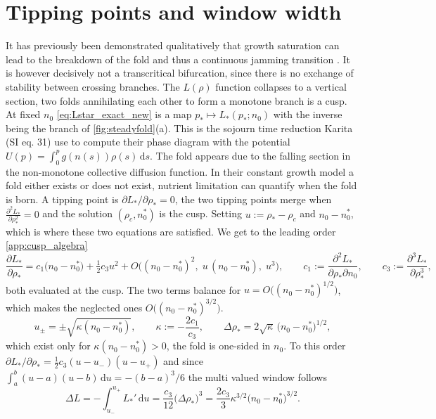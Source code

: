 \documentclass[11pt,a4paper]{report}
\newcommand{\dd}{\,\mathrm d}
\newcommand{\pd}{\partial}
\begin{document}
	\section{Tipping points and window width}
\label{sec:tipping}
It has previously been demonstrated qualitatively that growth saturation can lead to the breakdown of the fold and thus a continuous jamming transition \cite{peris}. It is however decisively not a transcritical bifurcation, since there is no exchange of stability between crossing branches. The $L(\rho)$ function collapses to a vertical section, two folds annihilating each other to form a monotone branch is a cusp.
At fixed $n_0$ \eqref{eq:Lstar_exact_new} is a map $p_*\mapsto L_*(p_*;n_0)$ with the inverse being the branch of \cref{fig:steadyfold}(a).  This is the sojourn time reduction Karita \cite{Karita} (SI eq. 31) use to compute their phase diagram with the potential $U(p)=\int_0^pg(n(s))\rho(s)\dd s$.
The fold appears due to the falling section in the non-monotone collective diffusion function. In their constant growth model a fold either exists or does not exist, nutrient limitation can quantify when the fold is born. A tipping point is $\pd L_*/\pd\rho_*=0$, the two tipping points merge when $\frac{\partial^2 L_*}{\partial \rho_*^2}=0$ and the solution
$(\rho_c,n_0^{*})$ is the cusp. Setting $u:=\rho_*-\rho_c$ and $n_0-n_0^{*}$, which is where these two equations are satisfied. We get to the leading order \cref{app:cusp_algebra}
\begin{equation}
	\frac{\pd L_*}{\pd\rho_*}
	=c_1\bigl(n_0-n_0^{*}\bigr)+\tfrac12c_3u^2
	+O\!\bigl((n_0-n_0^{*})^2,\;u\,(n_0-n_0^{*}),\;u^3\bigr),
	\qquad
	c_1:=\frac{\pd^2L_*}{\pd\rho_*\pd n_0},
	\qquad
	c_3:=\frac{\pd^3L_*}{\pd\rho_*^3},
	\label{eq:cusp_expansion}
\end{equation}
both evaluated at the cusp. The two terms balance for
$u=O\bigl((n_0-n_0^{*})^{1/2}\bigr)$, which makes the neglected ones
$O\bigl((n_0-n_0^{*})^{3/2}\bigr)$.
\begin{equation}
	u_{\pm}=\pm\sqrt{\kappa(n_0-n_0^{*})},
	\qquad
	\kappa:=-\frac{2c_1}{c_3},
	\qquad
	\Delta\rho_*=2\sqrt{\kappa}\,\bigl(n_0-n_0^{*}\bigr)^{1/2},
	\label{eq:cusp_separation}
\end{equation}
which exist only for $\kappa(n_0-n_0^*)>0$, the fold is one-sided in $n_0$. To this
order $\pd L_*/\pd\rho_*=\tfrac12c_3(u-u_-)(u-u_+)$ and since
$\int_a^b(u-a)(u-b)\dd u=-(b-a)^3/6$ the multi valued window follows
\begin{equation}
	\Delta L=-\int_{u_-}^{u_+}L_*'\dd u=\frac{c_3}{12}\bigl(\Delta\rho_*\bigr)^3
	=\frac{2c_3}{3}\kappa^{3/2}\bigl(n_0-n_0^{*}\bigr)^{3/2}.
	\label{eq:cusp_window}
\end{equation}
\end{document}
